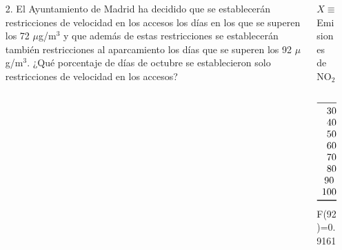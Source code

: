 \documentclass[aspectratio=149,10pt,t]{beamer}
\begin{document}
\begin{frame}
	\begin{columns}
		\begin{column}[T]{0.7\textwidth}
			\begin{enumerate}
				\item[2.] El Ayuntamiento de Madrid ha decidido que se establecerán restricciones de velocidad en los accesos los días en los que se superen los 72 $\mu$g/m$^3$ y que además de estas restricciones se establecerán también restricciones al aparcamiento los días que se superen los 92 $\mu$g/m$^3$.
				¿Qué porcentaje de días de octubre se establecieron solo restricciones de velocidad en los accesos?
			\end{enumerate}
		\end{column}
		\begin{column}[T]{0.3\textwidth}
			\begin{datos}
			$X\equiv$ Emisiones de NO$_2$\\
			\[
				\begin{array}{cc}
					X & F_i\\
					\midrule
					30 - 40 & 0.0645\\
    			40 - 50 & 0.2581\\
    			50 - 60 & 0.5161\\
    			60 - 70 & 0.6774\\
    			70 - 80 & 0.8387\\
    			80 - 90 & 0.9032\\
    			90 - 100 & 0.9677\\
    			100 - 110 & 1.0000\\
					\bottomrule
				\end{array}
			\]
			F(92)=0.9161
			\end{datos}
		\end{column}
	\end{columns}
\end{frame}
\end{document}

